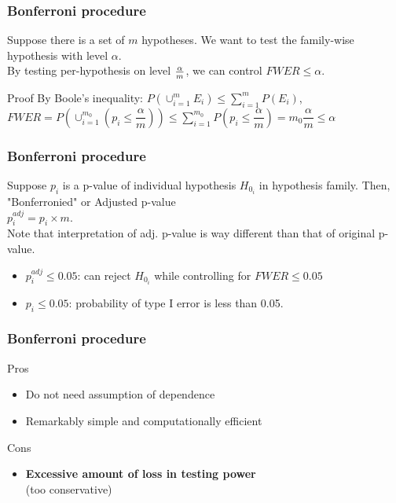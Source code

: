 \documentclass{beamer}
\begin{document}
\frame
{
  \frametitle{Bonferroni procedure}
    Suppose there is a set of $m$ hypotheses. We want to test the family-wise hypothesis with level $\alpha$.\vspace{0.07in}\\
    By testing per-hypothesis on level $\alpha \over m$, we can control $FWER \leq \alpha$.\vspace{0.22in}\\
    \begin{block}{Proof}
      By Boole's inequality: $P(\cup_{i=1}^{m}E_i)\leq\sum_{i=1}^m P(E_i)$\vspace{0.07in},\\
      \center $FWER=P(\cup_{i=1}^{m_0}(p_i\leq\dfrac{\alpha}{m}))\leq\sum_{i=1}^{m_0}P(p_i\leq\dfrac{\alpha}{m})=m_0\dfrac{\alpha}m\leq\alpha$
    \end{block}
}

\frame
{
  \frametitle{Bonferroni procedure}
    Suppose $p_i$ is a p-value of individual hypothesis $H_{0_i}$ in hypothesis family. Then, "Bonferronied" or Adjusted p-value\\ \center $p_i^{adj} = p_i \times m$.\vspace{0.1in}\\
    \flushleft Note that interpretation of adj. p-value is way different than that of original p-value.
    \begin{itemize}
      \item $p_i^{adj} \leq 0.05$: can reject $H_{0_i}$ while controlling for $FWER \leq 0.05$
      \item $p_i \leq 0.05$: probability of type I error is less than 0.05.\vspace{0.22in}\\
    \end{itemize}
}

\frame
{
    \frametitle{Bonferroni procedure}
    Pros
    \begin{itemize}
      \item Do not need assumption of dependence
      \item Remarkably simple and computationally efficient\vspace{0.1in}\\
    \end{itemize}
    
    Cons
    \begin{itemize}
      \item \textbf{Excessive amount of loss in testing power}\\ (too conservative)
    \end{itemize}
}
\end{document}
